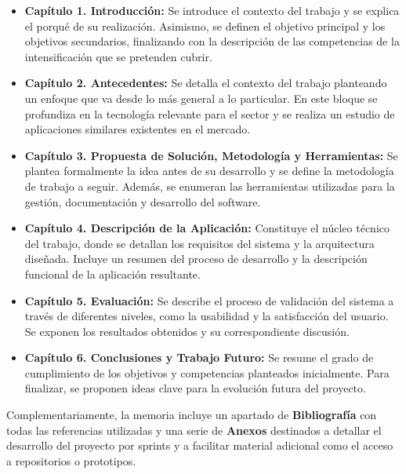 \begin{itemize}
    \item \textbf{Capítulo 1. Introducción:} Se introduce el contexto del trabajo y se explica el porqué de su realización. Asimismo, se definen el objetivo principal y los objetivos secundarios, finalizando con la descripción de las competencias de la intensificación que se pretenden cubrir.
    
    \item \textbf{Capítulo 2. Antecedentes:} Se detalla el contexto del trabajo planteando un enfoque que va desde lo más general a lo particular. En este bloque se profundiza en la tecnología relevante para el sector y se realiza un estudio de aplicaciones similares existentes en el mercado.
    
    \item \textbf{Capítulo 3. Propuesta de Solución, Metodología y Herramientas:} Se plantea formalmente la idea antes de su desarrollo y se define la metodología de trabajo a seguir. Además, se enumeran las herramientas utilizadas para la gestión, documentación y desarrollo del software.
    
    \item \textbf{Capítulo 4. Descripción de la Aplicación:} Constituye el núcleo técnico del trabajo, donde se detallan los requisitos del sistema y la arquitectura diseñada. Incluye un resumen del proceso de desarrollo y la descripción funcional de la aplicación resultante.
    
    \item \textbf{Capítulo 5. Evaluación:} Se describe el proceso de validación del sistema a través de diferentes niveles, como la usabilidad y la satisfacción del usuario. Se exponen los resultados obtenidos y su correspondiente discusión.
    
    \item \textbf{Capítulo 6. Conclusiones y Trabajo Futuro:} Se resume el grado de cumplimiento de los objetivos y competencias planteados inicialmente. Para finalizar, se proponen ideas clave para la evolución futura del proyecto.
\end{itemize}
Complementariamente, la memoria incluye un apartado de \textbf{Bibliografía} con todas las referencias utilizadas y una serie de \textbf{Anexos} destinados a detallar el desarrollo del proyecto por sprints y a facilitar material adicional como el acceso a repositorios o prototipos.